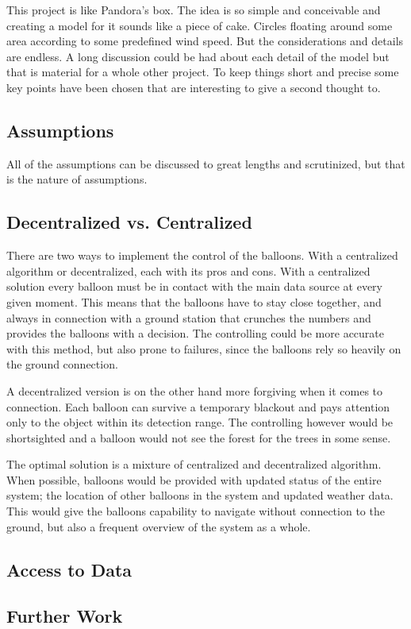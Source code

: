 This project is like Pandora's box. The idea is so simple and conceivable and creating a model for it sounds like a piece of cake. Circles floating around some area according to some predefined wind speed. But the considerations and details are endless. A long discussion could be had about each detail of the model but that is material for a whole other project. To keep things short and precise some key points have been chosen that are interesting to give a second thought to.
\subsection{Assumptions}
All of the assumptions can be discussed to great lengths and scrutinized, but that is the nature of assumptions.
\subsection{Decentralized vs. Centralized}
There are two ways to implement the control of the balloons. With a centralized algorithm or decentralized, each with its pros and cons. With a centralized solution every balloon must be in contact with the main data source at every given moment. This means that the balloons have to stay close together, and always in connection with a ground station that crunches the numbers and provides the balloons with a decision. The controlling could be more accurate with this method, but also prone to failures, since the balloons rely so heavily on the ground connection.

A decentralized version is on the other hand more forgiving when it comes to connection. Each balloon can survive a temporary blackout and pays attention only to the object within its detection range. The controlling however would be shortsighted and a balloon would not see the forest for the trees in some sense.

The optimal solution is a mixture of centralized and decentralized algorithm. When possible, balloons would be provided with updated status of the entire system; the location of other balloons in the system and updated weather data. This would give the balloons capability to navigate without connection to the ground, but also a frequent overview of the system as a whole. 
\subsection{Access to Data}
\subsection{Further Work}